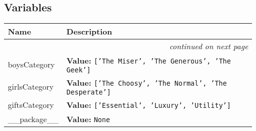 
  \subsection{Variables}

    \vspace{-1cm}
\hspace{\varindent}\begin{longtable}{|p{\varnamewidth}|p{\vardescrwidth}|l}
\cline{1-2}
\cline{1-2} \centering \textbf{Name} & \centering \textbf{Description}& \\
\cline{1-2}
\endhead\cline{1-2}\multicolumn{3}{r}{\small\textit{continued on next page}}\\\endfoot\cline{1-2}
\endlastfoot\raggedright b\-o\-y\-s\-C\-a\-t\-e\-g\-o\-r\-y\- & \raggedright \textbf{Value:} 
{\tt \texttt{[}\texttt{'}\texttt{The Miser}\texttt{'}\texttt{, }\texttt{'}\texttt{The Generous}\texttt{'}\texttt{, }\texttt{'}\texttt{The Geek}\texttt{'}\texttt{]}}&\\
\cline{1-2}
\raggedright g\-i\-r\-l\-s\-C\-a\-t\-e\-g\-o\-r\-y\- & \raggedright \textbf{Value:} 
{\tt \texttt{[}\texttt{'}\texttt{The Choosy}\texttt{'}\texttt{, }\texttt{'}\texttt{The Normal}\texttt{'}\texttt{, }\texttt{'}\texttt{The Desperate}\texttt{'}\texttt{]}}&\\
\cline{1-2}
\raggedright g\-i\-f\-t\-s\-C\-a\-t\-e\-g\-o\-r\-y\- & \raggedright \textbf{Value:} 
{\tt \texttt{[}\texttt{'}\texttt{Essential}\texttt{'}\texttt{, }\texttt{'}\texttt{Luxury}\texttt{'}\texttt{, }\texttt{'}\texttt{Utility}\texttt{'}\texttt{]}}&\\
\cline{1-2}
\raggedright \_\-\_\-p\-a\-c\-k\-a\-g\-e\-\_\-\_\- & \raggedright \textbf{Value:} 
{\tt None}&\\
\cline{1-2}
\end{longtable}

